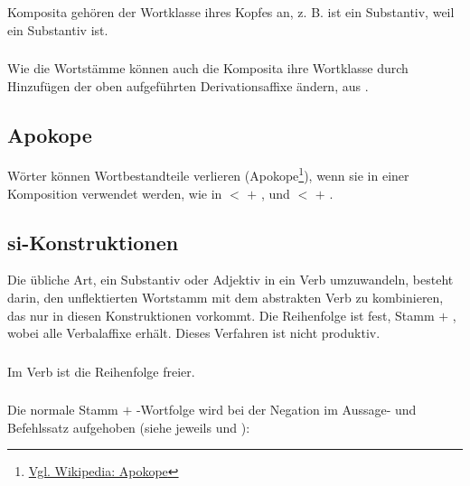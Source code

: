 \subsubsection{} Komposita gehören der Wortklasse ihres Kopfes an, z. B. ist   ein Substantiv, weil   ein Substantiv ist.

\subsubsection{} Wie die Wortstämme können auch die Komposita ihre Wortklasse durch Hinzufügen der oben aufgeführten Derivationsaffixe ändern,   aus  .

\subsection{Apokope} Wörter können Wortbestandteile verlieren (Apokope\footnote{\href{https://de.wikipedia.org/wiki/Apokope_(Sprachwissenschaft)}{Vgl. Wikipedia: Apokope}}), wenn sie in einer Komposition verwendet werden, wie in   $<$   $+$  , und   $<$   $+$  .

\subsection{si-Konstruktionen} Die übliche Art, ein Substantiv oder Adjektiv in ein Verb umzuwandeln, besteht darin, den unflektierten Wortstamm mit dem abstrakten Verb  zu kombinieren, das nur in diesen Konstruktionen vorkommt. Die Reihenfolge ist fest, Stamm $+$ , wobei  alle Verbalaffixe erhält. Dieses Verfahren ist nicht produktiv.\label{lingop:si-const}

\subsubsection{} Im Verb   ist die Reihenfolge freier.

\subsubsection{} Die normale Stamm $+$ -Wortfolge wird bei der Negation im Aussage- und Befehlssatz aufgehoben (siehe jeweils  und ):

